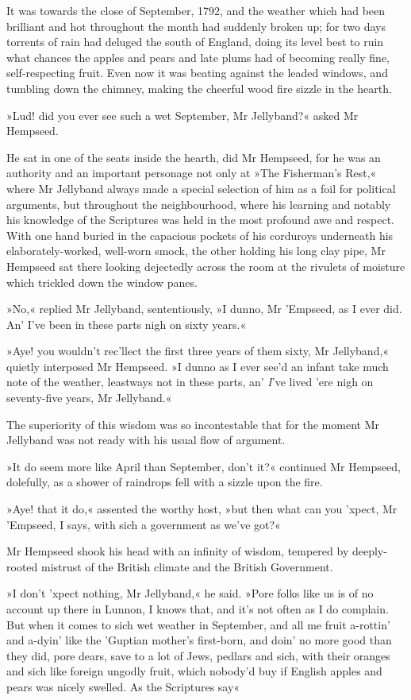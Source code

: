 It was towards the close of September, 1792, and the weather which had been brilliant and hot throughout the month had suddenly broken up; for two days torrents of rain had deluged the south of England, doing its level best to ruin what chances the apples and pears and late plums had of becoming really fine, self-respecting fruit. Even now it was beating against the leaded windows, and tumbling down the chimney, making the cheerful wood fire sizzle in the hearth.

»Lud! did you ever see such a wet September, Mr Jellyband?« asked Mr Hempseed.

He sat in one of the seats inside the hearth, did Mr Hempseed, for he was an authority and an important personage not only at »The Fisherman's Rest,« where Mr Jellyband always made a special selection of him as a foil for political arguments, but throughout the neighbourhood, where his learning and notably his knowledge of the Scriptures was held in the most profound awe and respect. With one hand buried in the capacious pockets of his corduroys underneath his elaborately-worked, well-worn smock, the other holding his long clay pipe, Mr Hempseed sat there looking dejectedly across the room at the rivulets of moisture which trickled down the window panes.

»No,« replied Mr Jellyband, sententiously, »I dunno, Mr 'Emp\-seed, as I ever did. An' I've been in these parts nigh on sixty years.«

»Aye! you wouldn't rec'llect the first three years of them sixty, Mr Jellyband,« quietly interposed Mr Hempseed. »I dunno as I ever see'd an infant take much note of the weather, leastways not in these parts, an' \textit{I}'ve lived 'ere nigh on seventy-five years, Mr Jellyband.«

The superiority of this wisdom was so incontestable that for the moment Mr Jellyband was not ready with his usual flow of argument.

»It do seem more like April than September, don't it?« continued Mr Hempseed, dolefully, as a shower of raindrops fell with a sizzle upon the fire.

»Aye! that it do,« assented the worthy host, »but then what can you 'xpect, Mr 'Empseed, I says, with sich a government as we've got?«

Mr Hempseed shook his head with an infinity of wisdom, tempered by deeply-rooted mistrust of the British climate and the British Government.

»I don't 'xpect nothing, Mr Jellyband,« he said. »Pore folks like us is of no account up there in Lunnon, I knows that, and it's not often as I do complain. But when it comes to sich wet weather in September, and all me fruit a-rottin' and a-dyin' like the 'Guptian mother's first-born, and doin' no more good than they did, pore dears, save to a lot of Jews, pedlars and sich, with their oranges and sich like foreign ungodly fruit, which nobody'd buy if English apples and pears was nicely swelled. As the Scriptures say\longdash«

